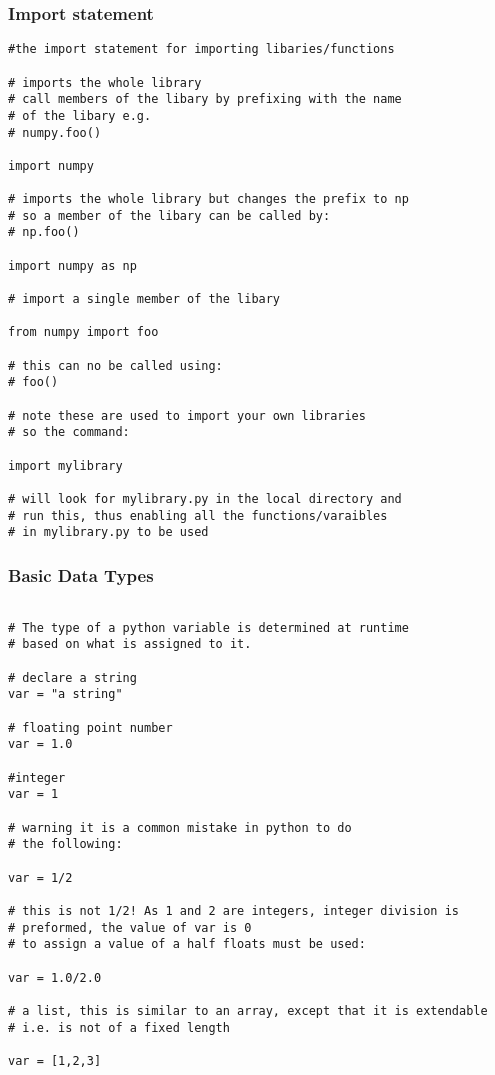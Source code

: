 \documentclass[11pt,a4paper]{article}
\begin{document}
\subsubsection{Import statement}
\begin{verbatim}
#the import statement for importing libaries/functions

# imports the whole library
# call members of the libary by prefixing with the name
# of the libary e.g.
# numpy.foo()

import numpy

# imports the whole library but changes the prefix to np
# so a member of the libary can be called by:
# np.foo()
 
import numpy as np

# import a single member of the libary

from numpy import foo

# this can no be called using:
# foo()

# note these are used to import your own libraries
# so the command:

import mylibrary

# will look for mylibrary.py in the local directory and 
# run this, thus enabling all the functions/varaibles
# in mylibrary.py to be used

\end{verbatim}

\subsubsection{Basic Data Types}
\begin{verbatim}

# The type of a python variable is determined at runtime
# based on what is assigned to it.

# declare a string
var = "a string"

# floating point number
var = 1.0

#integer
var = 1

# warning it is a common mistake in python to do
# the following:

var = 1/2

# this is not 1/2! As 1 and 2 are integers, integer division is
# preformed, the value of var is 0
# to assign a value of a half floats must be used:

var = 1.0/2.0

# a list, this is similar to an array, except that it is extendable
# i.e. is not of a fixed length

var = [1,2,3]

\end{verbatim}
\end{document}

